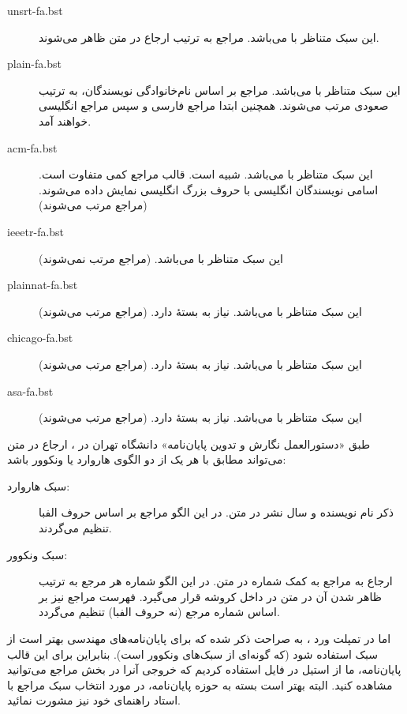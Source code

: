 \singlespacing
\begin{description}
\item [unsrt-fa.bst] این سبک متناظر با  می‌باشد. مراجع به ترتیب ارجاع در متن ظاهر می‌شوند.
\item [plain-fa.bst] این سبک متناظر با  می‌باشد. مراجع بر اساس نام‌خانوادگی نویسندگان، به ترتیب صعودی مرتب می‌شوند.
 همچنین ابتدا مراجع فارسی و سپس مراجع انگلیسی خواهند آمد.
\item [acm-fa.bst] این سبک متناظر با  می‌باشد. شبیه  است.  قالب مراجع کمی متفاوت است. اسامی نویسندگان انگلیسی با حروف بزرگ انگلیسی نمایش داده می‌شوند. (مراجع مرتب می‌شوند)
\item [ieeetr-fa.bst] این سبک متناظر با  می‌باشد. (مراجع مرتب نمی‌شوند)
\item [plainnat-fa.bst] این سبک متناظر با  می‌باشد. نیاز به بستهٔ  دارد. (مراجع مرتب می‌شوند)
\item [chicago-fa.bst] این سبک متناظر با  می‌باشد. نیاز به بستهٔ  دارد. (مراجع مرتب می‌شوند)
\item [asa-fa.bst] این سبک متناظر با  می‌باشد. نیاز به بستهٔ  دارد. (مراجع مرتب می‌شوند)
\end{description}
\doublespacing

طبق «دستورالعمل نگارش و تدوین پایان‌نامه» دانشگاه تهران در
\cite{UTThesisGuide}،
ارجاع در متن می‌تواند مطابق با هر یک از دو الگوی هاروارد یا ونکوور باشد:
\singlespacing
\begin{description}
	\item[سبک هاروارد:]
	ذکر نام نویسنده و سال نشر در متن. در این الگو مراجع بر اساس حروف الفبا تنظیم می‌گردند.
	\item[سبک ونکوور:]
	ارجاع به مراجع به کمک شماره در متن. در این الگو شماره هر مرجع به ترتیب ظاهر شدن آن در متن در داخل کروشه قرار می‌گیرد. فهرست مراجع نیز بر اساس شماره مرجع (نه حروف الفبا) تنظیم می‌گردد.
\end{description}
\doublespacing
اما در تمپلت ورد
\cite{UTThesisGuide}،
به صراحت ذکر شده که برای پایان‌نامه‌های مهندسی بهتر است از سبک 
استفاده شود (که گونه‌ای از سبک‌های ونکوور است).
بنابراین برای این قالب پایان‌نامه، ما از استیل
در فایل
استفاده کردیم که خروجی آنرا در بخش مراجع می‌توانید مشاهده کنید. البته بهتر است بسته به حوزه پایان‌نامه، در مورد انتخاب سبک مراجع با استاد راهنمای خود نیز مشورت نمائید.

